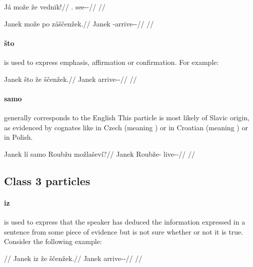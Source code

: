 \pex
\begingl
	\gla Já može že vednik!//
	\glb \Second{}.\Sg{} \Add{} \Ipfv{} see-\Pv{}-\Pf{}//
	\glft {}//
\endgl
\xe

\pex
\begingl
	\gla Janek može po záščenžek.//
	\glb Janek \Add{} \Ipfv{} \Neg{}-arrive-\Av{}-\Pf{}//
	\glft {}//
\endgl
\xe


\paragraph{što}  is used to express emphasis, affirmation or confirmation. For example:

\pex
\begingl
	\gla Janek što že ščenžek.//
	\glb Janek \Aff{} \Pfv{} arrive-\Av{}-\Pf{}//
	\glft {}//
\endgl
\xe

\paragraph{samo}  generally corresponds to the English 
This particle is most likely of Slavic origin, as evidenced by cognates like
 in Czech (meaning ) or in Croatian (meaning
) or  in Polish.

\pex
\begingl
	\gla Janek lí samo Roubžu možlaševí?//
	\glb Janek \Q{} \Excl{} Roubže-\Ins{} live-\Av{}-\Cont{}//
	\glft {}//
\endgl
\xe

\subsection{Class 3 particles}\label{sec:class3-particles}

\paragraph{iz}  is used to express that the speaker has deduced the
information expressed in a sentence from some piece of evidence but is not sure
whether or not it is true. Consider the following example:

\pex 
\begingl
	\glpreamble {}//
	\gla Janek iz že ščenžek.//
	\glb Janek \Infer{} \Pfv{} arrive-\Av{}-\Pf{}//
	\glft {}//
\endgl
\xe


